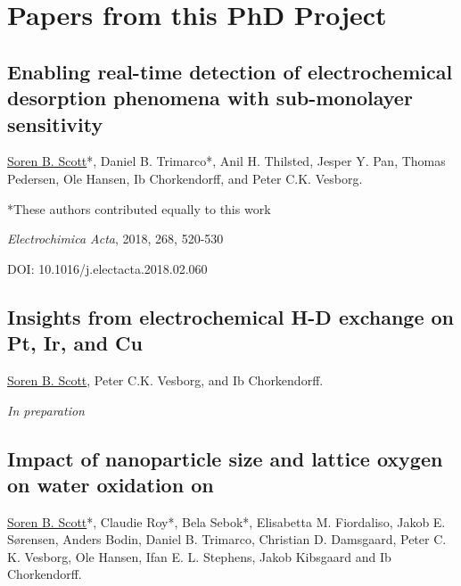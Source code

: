 \chapter{Papers from this PhD Project}
		
		\renewcommand{\thesection}{\Roman{section}}
		\titleformat{\section}{\normalfont\Large\bfseries}{Paper~\thesection}{1em}{}	
		
		\section{Enabling real-time detection of electrochemical desorption phenomena with sub-monolayer sensitivity}\label{Trimarco2018}
		
		\underline{Soren B. Scott}*, Daniel B. Trimarco*, Anil H. Thilsted, Jesper Y. Pan, Thomas Pedersen, Ole Hansen, Ib Chorkendorff, and Peter C.K. Vesborg. 
		
		*These authors contributed equally to this work
		
		\textit{Electrochimica Acta}, 2018, 268, 520-530
		
		DOI: 10.1016/j.electacta.2018.02.060
		
		
		
		
		
		\clearpage
		\section[In Preparation: Insights from electrochemical H-D exchange on Pt, Ir, and Cu]{Insights from electrochemical H-D exchange on Pt, Ir, and Cu}\label{Scott2019_HD}
				
		\underline{Soren B. Scott}, Peter C.K. Vesborg, and Ib Chorkendorff. 
		
		\textit{In preparation}
		
		
		\clearpage
		\section{Impact of nanoparticle size and lattice oxygen on water oxidation on }\label{Roy2018}
		
		\underline{Soren B. Scott}*, Claudie Roy*, Bela Sebok*, Elisabetta M. Fiordaliso, Jakob E. Sørensen, Anders Bodin, Daniel B. Trimarco, Christian D. Damsgaard, Peter C. K. Vesborg, Ole Hansen, Ifan E. L. Stephens, Jakob Kibsgaard and Ib Chorkendorff. 
		

